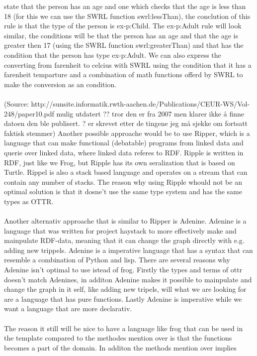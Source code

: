 state that the person has an age and one which checks that the age is less than 18 (for this we can use the SWRL function
swrl:lessThan), the conclution of this rule is that the type of the person is ex-p:Child. The ex-p:Adult rule will look 
similar, the conditions will be that the person has an age and that the age is greater then 17 (using the SWRL function 
swrl:greaterThan) and that has the condition that the person has type ex-p:Adult. We can also express the converting from farenheit
to celcius with SWRL using the condition that it has a farenheit temparture and a combination of math functions offerd by SWRL to 
make the conversion as an condition.
\\ \\
(Source: http://sunsite.informatik.rwth-aachen.de/Publications/CEUR-WS/Vol-248/paper10.pdf mulig utdatert ?? tror den er fra 2007 
men klarer ikke å finne datoen den ble publisert. ? er skrevet etter de tingene jeg må sjekke om fortsatt faktisk stemmer)
Another possible approache would be to use Ripper, which is a language that can make functional (debatable) programs from linked data
and querie over linked data, where linked data referes to RDF. 
Ripple is written in RDF, just like we Frog, but Ripple has its own seralization that is based on 
Turtle. Rippel is also a stack based language and operates on a stream that can contain any number of stacks.
The reason why using Ripple whould not be an optimal solution is that it dosne't use the same type system and has 
the same types as OTTR.   
\\ \\
Another alternativ approache that is similar to Ripper is Adenine. Adenine is a language that was written for project 
haystack to more effectively make and mainpulate RDF-data, meaning that it can change the graph directly with e.g. adding 
new trippels. 
Adenine is a imperative language that has a syntax that can resemble a combination of Python and lisp.
There are several reasons why Adenine isn't optimal to use istead of frog. Firstly the types and terms of 
ottr doesn't match Adenines, in additon Adenine makes it possible to mainpulate and change the graph in it self,
like adding new tripels, will what we are looking for are a language that has pure functions. Lastly Adenine is 
imperative while we want a language that are more declarativ. 
\\ \\
The reason it still will be nice to have a language like frog that can be used in the template compared to the 
methodes mention over is that the functions becomes a part of the domain. In additon the methods mention over implies
